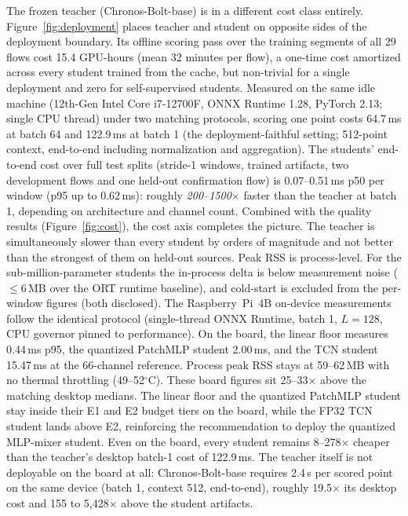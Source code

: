The frozen teacher (Chronos-Bolt-base) is in a different cost class
entirely. Figure~\ref{fig:deployment} places teacher and student on
opposite sides of the deployment boundary. Its offline scoring pass
over the training segments of all 29 flows cost 15.4 GPU-hours (mean
32 minutes per flow), a one-time cost amortized across every student
trained from the cache, but non-trivial for a single deployment and
zero for self-supervised students. Measured on the same idle machine
(12th-Gen Intel Core
i7-12700F, ONNX Runtime 1.28, PyTorch 2.13; single CPU thread) under
two matching protocols, scoring one point costs 64.7\,ms at batch 64
and 122.9\,ms at batch 1 (the deployment-faithful setting; 512-point
context, end-to-end including normalization and aggregation). The
students' end-to-end cost over full test splits (stride-1 windows,
trained artifacts, two development flows and one held-out
confirmation flow) is 0.07--0.51\,ms p50 per window (p95 up to
0.62\,ms): roughly
\emph{200--1500$\times$} faster than the teacher
at batch 1, depending on architecture and channel count. Combined with
the quality results (Figure~\ref{fig:cost}), the cost axis completes the picture. The teacher is
simultaneously slower than every student by orders of magnitude and not
better than the strongest of them on held-out sources. Peak RSS is
process-level. For the sub-million-parameter students the in-process
delta is below measurement noise ($\le$6\,MB over the ORT runtime
baseline), and cold-start is excluded from the per-window figures (both
disclosed). The Raspberry~Pi~4B on-device measurements follow the identical
protocol (single-thread ONNX Runtime, batch 1, $L=128$, CPU governor
pinned to performance).
On the board, the linear floor measures 0.44\,ms p95, the quantized
PatchMLP student 2.00\,ms, and the TCN student 15.47\,ms at the
66-channel reference.
Process peak RSS stays at 59--62\,MB with no thermal throttling
(49--52$^\circ$C).
These board figures sit 25--33$\times$ above the matching desktop
medians.
The linear floor and the quantized PatchMLP student stay inside their
E1 and E2 budget tiers on the board, while the FP32 TCN student lands
above E2, reinforcing the recommendation to deploy the quantized
MLP-mixer student.
Even on the board, every student remains 8--278$\times$ cheaper than
the teacher's desktop batch-1 cost of 122.9\,ms.
The teacher itself is not deployable on the board at all: Chronos-Bolt-base
requires 2.4\,s per scored point on the same device (batch 1, context
512, end-to-end), roughly 19.5$\times$ its desktop cost and 155 to
5{,}428$\times$ above the student artifacts.
